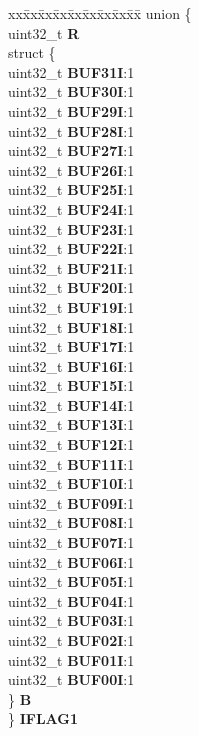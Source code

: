 \begin{DoxyCompactItemize}
\begin{tabbing}
\end{tabbing}\item 
\mbox{\label{structFLEXCAN__tag_abee8dd507d4ea3cc787c4fffd0db5f02}} 
\begin{tabbing}
xx\=xx\=xx\=xx\=xx\=xx\=xx\=xx\=xx\=\kill
union \{\\
\>uint32\_t {\bfseries R}\\
\>struct \{\\
\>\>uint32\_t {\bfseries BUF31I}:1\\
\>\>uint32\_t {\bfseries BUF30I}:1\\
\>\>uint32\_t {\bfseries BUF29I}:1\\
\>\>uint32\_t {\bfseries BUF28I}:1\\
\>\>uint32\_t {\bfseries BUF27I}:1\\
\>\>uint32\_t {\bfseries BUF26I}:1\\
\>\>uint32\_t {\bfseries BUF25I}:1\\
\>\>uint32\_t {\bfseries BUF24I}:1\\
\>\>uint32\_t {\bfseries BUF23I}:1\\
\>\>uint32\_t {\bfseries BUF22I}:1\\
\>\>uint32\_t {\bfseries BUF21I}:1\\
\>\>uint32\_t {\bfseries BUF20I}:1\\
\>\>uint32\_t {\bfseries BUF19I}:1\\
\>\>uint32\_t {\bfseries BUF18I}:1\\
\>\>uint32\_t {\bfseries BUF17I}:1\\
\>\>uint32\_t {\bfseries BUF16I}:1\\
\>\>uint32\_t {\bfseries BUF15I}:1\\
\>\>uint32\_t {\bfseries BUF14I}:1\\
\>\>uint32\_t {\bfseries BUF13I}:1\\
\>\>uint32\_t {\bfseries BUF12I}:1\\
\>\>uint32\_t {\bfseries BUF11I}:1\\
\>\>uint32\_t {\bfseries BUF10I}:1\\
\>\>uint32\_t {\bfseries BUF09I}:1\\
\>\>uint32\_t {\bfseries BUF08I}:1\\
\>\>uint32\_t {\bfseries BUF07I}:1\\
\>\>uint32\_t {\bfseries BUF06I}:1\\
\>\>uint32\_t {\bfseries BUF05I}:1\\
\>\>uint32\_t {\bfseries BUF04I}:1\\
\>\>uint32\_t {\bfseries BUF03I}:1\\
\>\>uint32\_t {\bfseries BUF02I}:1\\
\>\>uint32\_t {\bfseries BUF01I}:1\\
\>\>uint32\_t {\bfseries BUF00I}:1\\
\>\} {\bfseries B}\\
\} {\bfseries IFLAG1}\\


\end{tabbing}
\end{DoxyCompactItemize}
